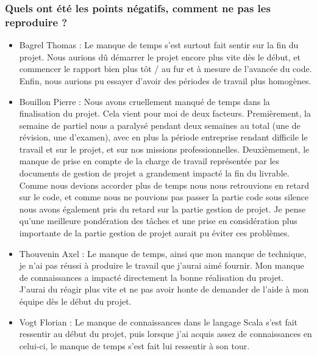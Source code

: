 \documentclass[a4paper, 12pt]{report}
\begin{document}
\subsubsection*{Quels ont été les points négatifs, comment ne pas les reproduire ?}
\begin{itemize}

\item
  Bagrel Thomas :
  Le manque de temps s’est surtout fait sentir sur la fin du projet. Nous aurions dû démarrer le projet encore plus vite dès le début, et commencer le rapport bien plus tôt / au fur et à mesure de l’avancée du code. Enfin, nous aurions pu essayer d’avoir des périodes de travail plus homogènes.


\item
  Bouillon Pierre :
  Nous avons cruellement manqué de temps dans la finalisation du projet. Cela vient pour moi de deux facteurs. Premièrement, la semaine de partiel nous a paralysé pendant deux semaines au total (une de révision, une d'examen), avec en plus la période entreprise rendant difficile le travail et sur le projet, et sur nos missions professionnelles. Deuxièmement, le manque de prise en compte de la charge de travail représentée par les documents de gestion de projet a grandement impacté la fin du livrable. Comme nous devions accorder plus de temps nous nous retrouvions en retard sur le code, et comme nous ne pouvions pas passer la partie code sous silence nous avons également pris du retard sur la partie gestion de projet.
  Je pense qu'une meilleure pondération des tâches et une prise en considération plus importante de la partie gestion de projet aurait pu éviter ces problèmes.
 
\item
  Thouvenin Axel :
  Le manque de temps, ainsi que mon manque de technique, je n’ai pas réussi à produire le travail que j’aurai aimé fournir. Mon manque de connaissances a impacté directement la bonne réalisation du projet. J’aurai du réagir plus vite et ne pas avoir honte de demander de l’aide à mon équipe dès le début du projet.

\item
  Vogt Florian :
  Le manque de connaissances dans le langage Scala s’est fait ressentir au début du projet, puis lorsque j’ai acquis assez de connaissances en celui-ci, le manque de temps s’est fait lui ressentir à son tour.

\end{itemize}
\end{document}
